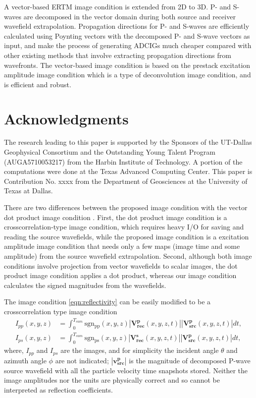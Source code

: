 \documentclass[manuscript,ulem,graphix,revised]{geophysics}
\begin{document}
A vector-based ERTM image condition is extended from 2D to 3D. P- and S-waves are decomposed in the vector domain during both source and receiver wavefield extrapolation. Propagation directions for P- and S-waves are efficiently calculated using Poynting vectors with the decomposed P- and S-wave vectors as input, and make the process of generating ADCIGs much cheaper compared with other existing methods that involve extracting propagation directions from wavefronts. 
The vector-based image condition is based on the prestack excitation amplitude image condition which is a type of deconvolution image condition, and is efficient and robust.


\section{Acknowledgments}

The research leading to this paper is supported by the Sponsors of the
UT-Dallas Geophysical Consortium and the Outstanding Young Talent Program (AUGA5710053217) from the Harbin Institute of Technology. A portion of the computations were done at the Texas Advanced Computing Center. This paper is Contribution No. xxxx
from the Department of Geosciences at the University of Texas at Dallas.


There are two differences between the proposed image condition with the vector dot product image condition \citep{wang_cl16,zhu17}. First, the dot product image condition is a crosscorrelation-type image condition, which requires heavy I/O for saving and reading the source wavefields, while the proposed image condition is a excitation amplitude image condition that needs only a few maps (image time and some amplitude) from the source wavefield extrapolation. Second, although both image conditions involve projection from vector wavefields to scalar images, the dot product image condition applies a dot product, whereas our image condition calculates the signed magnitudes from the wavefields.

The image condition \ref{eqn:reflectivity} can be easily modified to be a crosscorrelation type image condition
\begin{equation}
\begin{aligned}
I_{pp}(x,y,z)&=\int_0^{T_{sum}}\mathrm{sgn_{pp}}(x,y,z)|\mathbf{V^p_{rec}}(x,y,z,t)||\mathbf{V^p_{src}}(x,y,z,t)|dt,\\
I_{ps}(x,y,z)&=\int_0^{T_{sum}}\mathrm{sgn_{ps}}(x,y,z)|\mathbf{V^s_{rec}}(x,y,z,t)||\mathbf{V^p_{src}}(x,y,z,t)|dt,
\end{aligned}
\label{eqn:crsc}
\end{equation}
where, $I_{pp}$ and $I_{ps}$ are the images, and for simplicity the incident angle $\theta$ and azimuth angle $\phi$ are not indicated; $|\mathbf{v^p_{src}}|$ is the magnitude of decomposed P-wave source wavefield with all the particle velocity time snapshots stored. Neither the image amplitudes nor the units are physically correct and so cannot be interpreted as reflection coefficients.
\end{document}
